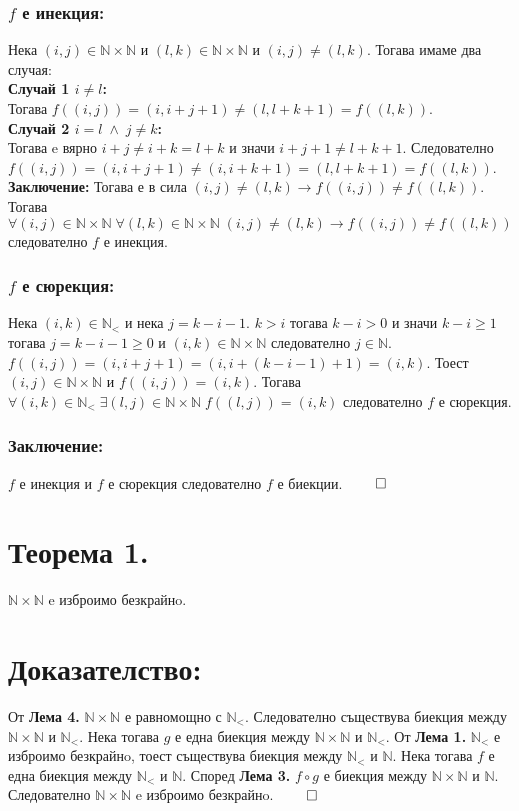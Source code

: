 \documentclass[a4paper, 12pt, oneside]{article}
\newcommand{\N}{\mathbb{N}}
\newcommand{\LN}{\N_<}
\begin{document}
\subsubsection*{\(f\) е инекция:}
Нека \((i, j) \in \N\times\N\) и \((l, k) \in \N\times\N\) и \((i, j) \neq (l, k)\).
Тогава имаме два случая: \\
\textbf{Случай 1 \(i \neq l\):} \\
Тогава \(f((i, j)) = (i, i + j + 1) \neq (l, l + k + 1) = f((l, k))\). \\
\textbf{Случай 2 \(i = l \; \land \; j \neq k\):} \\
Тогава e вярно \(i + j \neq i + k = l + k\) и значи \(i + j + 1 \neq l + k + 1\).
Следователно \(f((i, j)) = (i, i + j + 1) \neq (i, i + k + 1) = (l, l + k + 1) = f((l, k))\). \\
\textbf{Заключение:}
Тогава е в сила \((i, j) \neq (l, k) \longrightarrow f((i, j)) \neq f((l, k))\). \\
Тогава \(\forall (i, j) \in \N\times\N \; \forall (l, k) \in \N\times\N \; (i, j) \neq (l, k) \longrightarrow f((i, j)) \neq f((l, k))\) \\
следователно \(f\) е инекция.
\subsubsection*{\(f\) е сюрекция:}
Нека \((i, k) \in \LN\) и нека \(j = k - i - 1\).
\(k > i\) тогава \(k - i > 0\) и значи \(k - i \geq 1\)
тогава \(j = k - i - 1 \geq 0\) и \((i, k) \in \N\times\N\)
следователно \(j \in \N\).
\(f((i, j)) = (i, i + j + 1) = (i, i + (k - i - 1) + 1) = (i, k)\).
Тоест \((i, j) \in \N\times\N\) и \(f((i, j)) = (i, k)\).
Тогава \(\forall (i, k) \in \LN \; \exists (l, j) \in \N\times\N \; f((l, j)) = (i, k)\)
следователно \(f\) е сюрекция.
\subsubsection*{Заключение:}
\(f\) е инекция и \(f\) е сюрекция следователно \(f\) е биекции. \(\qed\)
\section*{Теорема 1.}
\(\N\times\N\) e изброимо безкрайнo.
\section*{Доказателство:}
От \textbf{Лема 4.} \(\N\times\N\) е равномощно с \(\LN\).
Следователно съществува биекция между \(\N\times\N\) и \(\LN\).
Нека тогава \(g\) е една биекция между \(\N\times\N\) и \(\LN\).
От \textbf{Лема 1.} \(\LN\) е изброимо безкрайнo, тоест съществува биекция между \(\LN\) и \(\N\).
Нека тогава \(f\) е една биекция между \(\LN\) и \(\N\).
Според \textbf{Лема 3.} \(f \circ g\) е биекция между \(\N\times\N\) и \(\N\).
Следователно \(\N\times\N\) e изброимо безкрайнo. \(\qed\)
\end{document}
